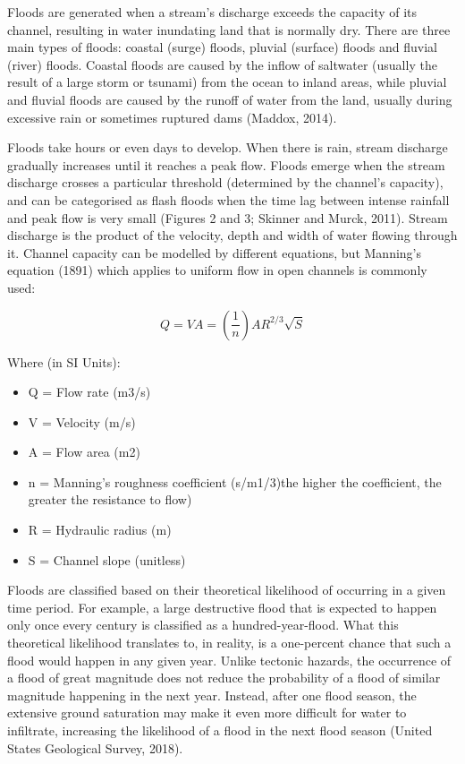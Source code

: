 Floods are generated when a stream’s discharge exceeds the capacity of its channel, resulting in water inundating land that is normally dry. There are three main types of floods: coastal (surge) floods, pluvial (surface) floods and fluvial (river) floods. Coastal floods are caused by the inflow of saltwater (usually the result of a large storm or tsunami) from the ocean to inland areas, while pluvial and fluvial floods are caused by the runoff of water from the land, usually during excessive rain or sometimes ruptured dams (Maddox, 2014). 

Floods take hours or even days to develop. When there is rain, stream discharge gradually increases until it reaches a peak flow. Floods emerge when the stream discharge crosses a particular threshold (determined by the channel’s capacity), and can be categorised as flash floods when the time lag between intense rainfall and peak flow is very small (Figures 2 and 3; Skinner and Murck, 2011). Stream discharge is the product of the velocity, depth and width of water flowing through it. Channel capacity can be modelled by different equations, but Manning’s equation (1891) which applies to uniform flow in open channels is commonly used:

\begin{equation}
Q = VA = (\frac{1}{n})AR^{2/3}\sqrt{S}
\end{equation}
 
\noindent Where (in SI Units):

\begin{itemize}
	\item Q = Flow rate (m3/s)
	\item V = Velocity (m/s)
	\item A = Flow area (m2)
	\item n = Manning’s roughness coefficient (s/m1/3)the higher the coefficient, the greater the resistance to flow)
	\item R = Hydraulic radius (m)
	\item S = Channel slope (unitless)
\end{itemize}

Floods are classified based on their theoretical likelihood of occurring in a given time period. For example, a large destructive flood that is expected to happen only once every century is classified as a hundred-year-flood. What this theoretical likelihood translates to, in reality, is a one-percent chance that such a flood would happen in any given year. Unlike tectonic hazards, the occurrence of a flood of great magnitude does not reduce the probability of a flood of similar magnitude happening in the next year. Instead, after one flood season, the extensive ground saturation may make it even more difficult for water to infiltrate, increasing the likelihood of a flood in the next flood season (United States Geological Survey, 2018). 

